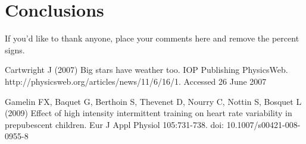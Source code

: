 \documentclass[twocolumn,draft]{svjour3}
\begin{document}
\section{Conclusions}
\label{conclusions}

\begin{acknowledgements}
If you'd like to thank anyone, place your comments here
and remove the percent signs.
\end{acknowledgements}


\begin{thebibliography}{}

Cartwright J (2007) Big stars have weather too. IOP Publishing PhysicsWeb.
http://physicsweb.org/articles/news/11/6/16/1. Accessed 26 June 2007

Gamelin FX, Baquet G, Berthoin S, Thevenet D, Nourry C, Nottin S, Bosquet L
(2009) Effect of high intensity intermittent training on heart rate variability
in prepubescent children. Eur J Appl Physiol 105:731-738.
doi: 10.1007/s00421-008-0955-8


\end{thebibliography}
\end{document}
